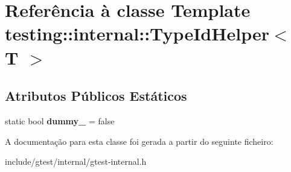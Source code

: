 \hypertarget{classtesting_1_1internal_1_1TypeIdHelper}{\section{Referência à classe Template testing\-:\-:internal\-:\-:Type\-Id\-Helper$<$ T $>$}
\label{classtesting_1_1internal_1_1TypeIdHelper}
}
\subsection*{Atributos Públicos Estáticos}
\begin{DoxyCompactItemize}
\item 
\hypertarget{classtesting_1_1internal_1_1TypeIdHelper_a372268b1520d965d0bdf01ebad3d270e}{static bool {\bfseries dummy\-\_\-} = false}\label{classtesting_1_1internal_1_1TypeIdHelper_a372268b1520d965d0bdf01ebad3d270e}

\end{DoxyCompactItemize}


A documentação para esta classe foi gerada a partir do seguinte ficheiro\-:\begin{DoxyCompactItemize}
\item 
include/gtest/internal/gtest-\/internal.\-h\end{DoxyCompactItemize}
